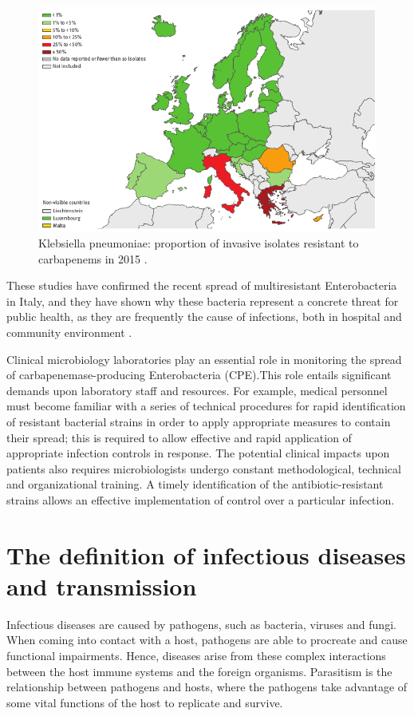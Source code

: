 \documentclass[11pt]{report}
\begin{document}
\clearpage
\begin{figure}[htp]
\centering
\includegraphics[scale=0.60]{img/K.pneu_2015.png}
\caption{Klebsiella pneumoniae: proportion of invasive isolates resistant to carbapenems in 2015 \cite{ECDC_Surveillance}.}
\label{}
\end{figure}

These studies have confirmed the recent spread of multiresistant Enterobacteria in Italy, and they have shown why these bacteria represent a concrete threat for public health, as they are frequently the cause of infections, both in hospital and community environment \cite{circolare2013}.

Clinical microbiology laboratories play an essential role in monitoring the spread of carbapenemase-producing Enterobacteria (CPE).This role entails significant demands upon laboratory staff and resources. For example, medical personnel must become familiar with a series of technical procedures for rapid identification of resistant bacterial strains in order to apply appropriate measures to contain their spread; this is required to allow effective and rapid application of appropriate infection controls in response. The potential clinical impacts upon patients also requires microbiologists undergo constant methodological, technical and organizational training. A timely identification of the antibiotic-resistant strains allows an effective implementation of control over a particular infection.

\section{The definition of infectious diseases and transmission}
Infectious diseases are caused by pathogens, such as bacteria, viruses and fungi. When coming into contact with a host, pathogens are able to procreate and cause functional impairments. Hence, diseases arise from these complex interactions between the host immune systems and the foreign organisms. Parasitism is the relationship between pathogens and hosts, where the pathogens take advantage of some vital functions of the host to replicate and survive. 
\end{document}
